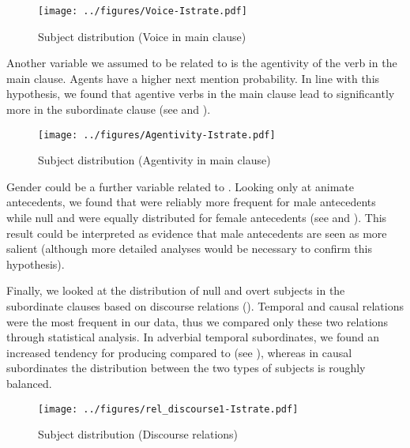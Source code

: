 \documentclass[output=paper,colorlinks,citecolor=brown]{langscibook}
\begin{document}
\begin{figure}[h]
\centering
\texttt{[image: ../figures/Voice-Istrate.pdf]}
\caption{Subject distribution (Voice in main clause)}
\label{voice:Istrate}
\end{figure}

Another variable we assumed to be related to  is the agentivity of the verb in the main clause. Agents have a higher next mention probability. In line with this hypothesis, we found that agentive verbs in the main clause lead to significantly more  in the subordinate clause (see  and ).

\begin{figure}[h]
\centering
\texttt{[image: ../figures/Agentivity-Istrate.pdf]}
\caption{Subject distribution (Agentivity in main clause)}
\label{agentivity:Istrate}
\end{figure}

Gender could be a further variable related to  . Looking only at animate antecedents, we found that  were reliably more frequent for male antecedents while null and  were equally distributed for female antecedents (see  and ). This result could be interpreted as evidence that male antecedents are seen as more salient (although more detailed analyses would be necessary to confirm this hypothesis). 

Finally, we looked at the distribution of null and overt subjects in the subordinate clauses based on discourse relations (). Temporal and causal relations were the most frequent in our data, thus we compared only these two relations through statistical analysis. In adverbial temporal subordinates, we found an increased tendency for producing  compared to  (see ), whereas in causal subordinates the distribution between the two types of subjects is roughly balanced.

\begin{figure}[h]
\centering
\texttt{[image: ../figures/rel\_discourse1-Istrate.pdf]}
\caption{Subject distribution (Discourse relations)}
\label{subj_dist_disc:Istrate}

\end{figure}
\end{document}
